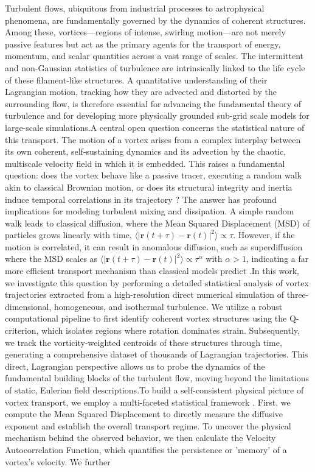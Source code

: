 \documentclass[]{article}
\begin{document}
Turbulent flows, ubiquitous from industrial processes to astrophysical phenomena, are fundamentally governed by the dynamics of coherent structures. Among these, vortices—regions of intense, swirling motion—are not merely passive features but act as the primary agents for the transport of energy, momentum, and scalar quantities across a vast range of scales. The intermittent and non-Gaussian statistics of turbulence are intrinsically linked to the life cycle of these filament-like structures. A quantitative understanding of their Lagrangian motion, tracking how they are advected and distorted by the surrounding flow, is therefore essential for advancing the fundamental theory of turbulence and for developing more physically grounded sub-grid scale models for large-scale simulations.A central open question concerns the statistical nature of this transport. The motion of a vortex arises from a complex interplay between its own coherent, self-sustaining dynamics and its advection by the chaotic, multiscale velocity field in which it is embedded. This raises a fundamental question: does the vortex behave like a passive tracer, executing a random walk akin to classical Brownian motion, or does its structural integrity and inertia induce temporal correlations in its trajectory  \citep{maiti2025vorticitypackingeffectslong}? The answer has profound implications for modeling turbulent mixing and dissipation. A simple random walk leads to classical diffusion, where the Mean Squared Displacement (MSD) of particles grows linearly with time, $\langle |\mathbf{r}(t+\tau) - \mathbf{r}(t)|^2 \rangle \propto \tau$. However, if the motion is correlated, it can result in anomalous diffusion, such as superdiffusion where the MSD scales as $\langle |\mathbf{r}(t+\tau) - \mathbf{r}(t)|^2 \rangle \propto \tau^\alpha$ with $\alpha > 1$, indicating a far more efficient transport mechanism than classical models predict  \citep{leoncini2002jetsstickinessanomaloustransport,maiti2025vorticitypackingeffectslong}.In this work, we investigate this question by performing a detailed statistical analysis of vortex trajectories extracted from a high-resolution direct numerical simulation of three-dimensional, homogeneous, and isothermal turbulence. We utilize a robust computational pipeline to first identify coherent vortex structures using the Q-criterion, which isolates regions where rotation dominates strain. Subsequently, we track the vorticity-weighted centroids of these structures through time, generating a comprehensive dataset of thousands of Lagrangian trajectories. This direct, Lagrangian perspective allows us to probe the dynamics of the fundamental building blocks of the turbulent flow, moving beyond the limitations of static, Eulerian field descriptions.To build a self-consistent physical picture of vortex transport, we employ a multi-faceted statistical framework  \citep{kumar2025trappingtransportinertialparticles,aulnette2025transportsphericalmicroparticles3d}. First, we compute the Mean Squared Displacement to directly measure the diffusive exponent and establish the overall transport regime. To uncover the physical mechanism behind the observed behavior, we then calculate the Velocity Autocorrelation Function, which quantifies the persistence or 'memory' of a vortex's velocity. We further 
\end{document}
